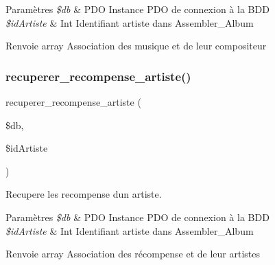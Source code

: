 \begin{DoxyParams}{Paramètres}
{\em \$db} & P\+DO Instance P\+DO de connexion à la B\+DD \\
\hline
{\em \$id\+Artiste} & Int Identifiant artiste dans Assembler\+\_\+\+Album \\
\hline
\end{DoxyParams}
\begin{DoxyReturn}{Renvoie}
array Association des musique et de leur compositeur 
\end{DoxyReturn}
\mbox{\label{fonctionArtiste_8php_a9d9d26b5ff7bfe4275fb4a9f0d1e9c65}} 
\subsubsection{\texorpdfstring{recuperer\+\_\+recompense\+\_\+artiste()}{recuperer\_recompense\_artiste()}}
{\footnotesize\ttfamily recuperer\+\_\+recompense\+\_\+artiste (\begin{DoxyParamCaption}\item[{}]{\$db,  }\item[{}]{\$id\+Artiste }\end{DoxyParamCaption})}



Recupere les recompense d\textquotesingle{}un artiste. 


\begin{DoxyParams}{Paramètres}
{\em \$db} & P\+DO Instance P\+DO de connexion à la B\+DD \\
\hline
{\em \$id\+Artiste} & Int Identifiant artiste dans Assembler\+\_\+\+Album \\
\hline
\end{DoxyParams}
\begin{DoxyReturn}{Renvoie}
array Association des récompense et de leur artistes 
\end{DoxyReturn}
\mbox{\label{fonctionArtiste_8php_a8586d94e19d8dd5c149ae508f2e4d26a}} 

